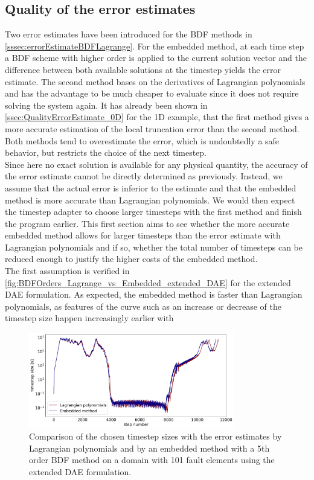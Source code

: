 \subsection{Quality of the error estimates}
Two error estimates have been introduced for the BDF methods in \autoref{sssec:errorEstimateBDFLagrange}. For the embedded method, at each time step a BDF scheme with higher order is applied to the current solution vector and the difference between both available solutions at the timestep yields the error estimate. The second method bases on the derivatives of Lagrangian polynomials and has the advantage to be much cheaper to evaluate since it does not require solving the system again. It has already been shown in \autoref{ssec:QualityErrorEstimate_0D} for the 1D example, that the first method gives a more accurate estimation of the local truncation error than the second method. Both methods tend to overestimate the error, which is undoubtedly a safe behavior, but restricts the choice of the next timestep. \\
Since here no exact solution is available for any physical quantity, the accuracy of the error estimate cannot be directly determined as previously. Instead, we assume that the actual error is inferior to the estimate and that the embedded method is more accurate than Lagrangian polynomials. We would then expect the timestep adapter to choose larger timesteps with the first method and finish the program earlier. This first section aims to see whether the more accurate embedded method allows for larger timesteps than the error estimate with Lagrangian polynomials and if so, whether the total number of timesteps can be reduced enough to justify the higher costs of the embedded method. \\
The first assumption is verified in \autoref{fig:BDFOrders_Lagrange_vs_Embedded_extended_DAE} for the extended DAE formulation. As expected, the embedded method is faster than Lagrangian polynomials, as features of the curve such as an increase or decrease of the timestep size happen increasingly earlier with 

\begin{figure}[H]
	\centering
	\includegraphics[width=0.8\textwidth]{images/TANDEMTimeAnalysisDifferentBDFOrdersEmbedded_vs_Lagrange_ExtendedDAE_Size101.png}
	\caption{Comparison of the chosen timestep sizes with the error estimates by Lagrangian polynomials and by an embedded method with a 5th order BDF method on a domain with 101 fault elements using the extended DAE formulation. }
	\label{fig:BDFOrders_Lagrange_vs_Embedded_extended_DAE}
\end{figure}

